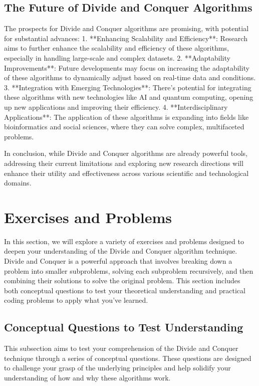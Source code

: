 \documentclass[12pt]{book} %
\begin{document}
\subsection{The Future of Divide and Conquer Algorithms}

The prospects for Divide and Conquer algorithms are promising, with potential for substantial advances:
1. **Enhancing Scalability and Efficiency**: Research aims to further enhance the scalability and efficiency of these algorithms, especially in handling large-scale and complex datasets.
2. **Adaptability Improvements**: Future developments may focus on increasing the adaptability of these algorithms to dynamically adjust based on real-time data and conditions.
3. **Integration with Emerging Technologies**: There's potential for integrating these algorithms with new technologies like AI and quantum computing, opening up new applications and improving their efficiency.
4. **Interdisciplinary Applications**: The application of these algorithms is expanding into fields like bioinformatics and social sciences, where they can solve complex, multifaceted problems.

In conclusion, while Divide and Conquer algorithms are already powerful tools, addressing their current limitations and exploring new research directions will enhance their utility and effectiveness across various scientific and technological domains.



\section{Exercises and Problems}
In this section, we will explore a variety of exercises and problems designed to deepen your understanding of the Divide and Conquer algorithm technique. Divide and Conquer is a powerful approach that involves breaking down a problem into smaller subproblems, solving each subproblem recursively, and then combining their solutions to solve the original problem. This section includes both conceptual questions to test your theoretical understanding and practical coding problems to apply what you've learned.

\subsection{Conceptual Questions to Test Understanding}
This subsection aims to test your comprehension of the Divide and Conquer technique through a series of conceptual questions. These questions are designed to challenge your grasp of the underlying principles and help solidify your understanding of how and why these algorithms work.
\end{document}
